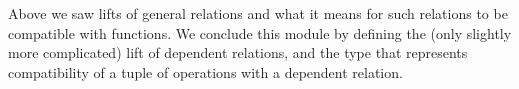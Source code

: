 \documentclass[a4paper,UKenglish,cleveref,autoref,thm-restate,11pt]{lipics-v2021}
\begin{document}
Above we saw lifts of general relations and what it means for such relations to be compatible with functions. We conclude this module by defining the (only slightly more complicated) lift of dependent relations, and the type that represents compatibility of a tuple of operations with a dependent relation.
\ccpad
\begin{code}%
\>[0]\AgdaSpace{}%
\AgdaModule{\AgdaUnderscore{}}\AgdaSpace{}%
\AgdaSymbol{\{}\AgdaSpace{}%
\AgdaSpace{}%
\AgdaSpace{}%
\AgdaSymbol{:}\AgdaSpace{}%
\AgdaSymbol{\}}\AgdaSpace{}%
\AgdaSymbol{\{}\AgdaSpace{}%
\AgdaSpace{}%
\AgdaSymbol{:}\AgdaSpace{}%
\AgdaSpace{}%
\AgdaSymbol{\}}\AgdaSpace{}%
\AgdaSymbol{\{}\AgdaSpace{}%
\AgdaSymbol{:}\AgdaSpace{}%
\AgdaSpace{}%
\AgdaSpace{}%
\AgdaSpace{}%
\AgdaSymbol{\}}\AgdaSpace{}%
\<%
\\
%
\\[\AgdaEmptyExtraSkip]%
\>[0][@{}l@{\AgdaIndent{0}}]%
\>[1]\AgdaSpace{}%
\AgdaSymbol{:}\AgdaSpace{}%
\AgdaSpace{}%
\AgdaSpace{}%
\AgdaSpace{}%
\AgdaSpace{}%
\AgdaSpace{}%
\AgdaSpace{}%
\AgdaSpace{}%
\AgdaSpace{}%
\AgdaSpace{}%
\AgdaSpace{}%
\AgdaSpace{}%
\AgdaSymbol{)}\AgdaSpace{}%
\AgdaSpace{}%
\AgdaSpace{}%
\AgdaSpace{}%
\AgdaSpace{}%
\<%
\\
%
\>[1]\AgdaSpace{}%
\AgdaSpace{}%
\AgdaSpace{}%
\AgdaSymbol{=}\AgdaSpace{}%
\AgdaSpace{}%
\AgdaSymbol{(}\AgdaSpace{}%
\AgdaSymbol{:}\AgdaSpace{}%
\AgdaSymbol{)}\AgdaSpace{}%
\AgdaSpace{}%
\AgdaSpace{}%
\AgdaSpace{}%
\AgdaSpace{}%
\AgdaSpace{}%
\AgdaSymbol{(}\AgdaSpace{}%
\AgdaSymbol{)}\AgdaSpace{}%
\AgdaSymbol{)}\<%
\\
%
\\[\AgdaEmptyExtraSkip]%
%
\>[1]\AgdaSpace{}%
\AgdaSymbol{:}\AgdaSpace{}%
\AgdaSpace{}%
\AgdaSpace{}%
\AgdaSpace{}%

\end{code}
\end{document}
